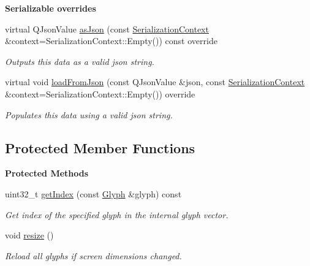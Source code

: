 \begin{Indent}\textbf{ Serializable overrides}\par
\begin{DoxyCompactItemize}
\item 
\mbox{\label{classrev_1_1_canvas_component_a204a29a0f44b4afe36b85055543d69cf}} 
virtual Q\+Json\+Value \mbox{\hyperlink{classrev_1_1_canvas_component_a204a29a0f44b4afe36b85055543d69cf}{as\+Json}} (const \mbox{\hyperlink{structrev_1_1_serialization_context}{Serialization\+Context}} \&context=Serialization\+Context\+::\+Empty()) const override
\begin{DoxyCompactList}\small\item\em Outputs this data as a valid json string. \end{DoxyCompactList}\item 
\mbox{\label{classrev_1_1_canvas_component_a0be9ba52e0b3f9b5af14b69b26392e71}} 
virtual void \mbox{\hyperlink{classrev_1_1_canvas_component_a0be9ba52e0b3f9b5af14b69b26392e71}{load\+From\+Json}} (const Q\+Json\+Value \&json, const \mbox{\hyperlink{structrev_1_1_serialization_context}{Serialization\+Context}} \&context=Serialization\+Context\+::\+Empty()) override
\begin{DoxyCompactList}\small\item\em Populates this data using a valid json string. \end{DoxyCompactList}\end{DoxyCompactItemize}
\end{Indent}
\subsection*{Protected Member Functions}
\begin{Indent}\textbf{ Protected Methods}\par
\begin{DoxyCompactItemize}
\item 
\mbox{\label{classrev_1_1_canvas_component_a950de206d4975204c656ef8a306a8771}} 
uint32\+\_\+t \mbox{\hyperlink{classrev_1_1_canvas_component_a950de206d4975204c656ef8a306a8771}{get\+Index}} (const \mbox{\hyperlink{classrev_1_1_glyph}{Glyph}} \&glyph) const
\begin{DoxyCompactList}\small\item\em Get index of the specified glyph in the internal glyph vector. \end{DoxyCompactList}\item 
\mbox{\label{classrev_1_1_canvas_component_ac182202887f3c48ce09b5ee93c7ca522}} 
void \mbox{\hyperlink{classrev_1_1_canvas_component_ac182202887f3c48ce09b5ee93c7ca522}{resize}} ()
\begin{DoxyCompactList}\small\item\em Reload all glyphs if screen dimensions changed. \end{DoxyCompactList}\end{DoxyCompactItemize}
\end{Indent}
